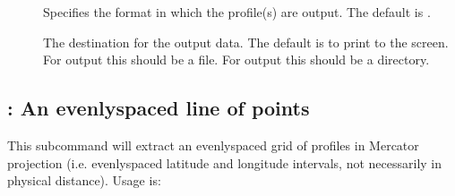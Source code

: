 \documentclass[letterpaper,10pt,english]{sphinxmanual}
\begin{document}
\sphinxAtStartPar
{}
\begin{description}
\item[{}] \leavevmode
\sphinxAtStartPar
Specifies the format in which the profile(s) are output.  The default is .

\item[{}] \leavevmode
\sphinxAtStartPar
The destination for the output data.  The default is to print to the screen.  For  output this should be a file.  For  output this should be a directory.

\item[{}] \leavevmode
\sphinxAtStartPar
{}

\sphinxAtStartPar
{}

\end{description}


\subsection{: An evenly\sphinxhyphen{}spaced line of points}
\label{\detokenize{userguide:grid-an-evenly-spaced-line-of-points}}
\sphinxAtStartPar
This subcommand will extract an evenly\sphinxhyphen{}spaced grid of profiles in Mercator projection (i.e. evenly\sphinxhyphen{}spaced latitude and longitude intervals, not necessarily in physical distance).  Usage is:
\end{document}
